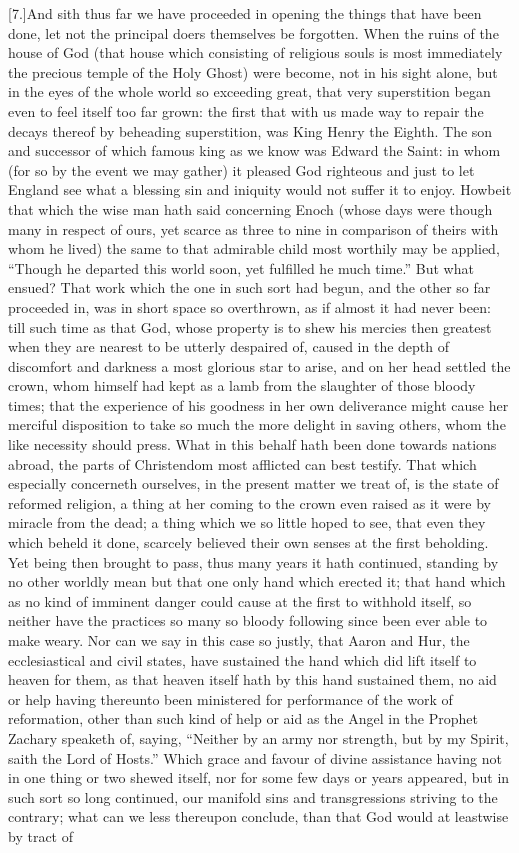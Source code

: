 [7.]And sith thus far we have proceeded in opening the things that have been done, let not the principal doers themselves be forgotten. When the ruins of the house of God (that house which consisting of religious souls is most immediately the precious temple of the Holy Ghost) were become, not in his sight alone, but in the eyes of the whole world so exceeding great, that very superstition began even to feel itself too far grown: the first that with us made way to repair the decays thereof by beheading superstition, was King Henry the Eighth. The son and successor of which famous king as we know was Edward the Saint: in whom (for so by the event we may gather) it pleased God righteous and just to let England see what a blessing sin and iniquity would not suffer it to enjoy. Howbeit that which the wise man hath said concerning Enoch (whose days were though many in respect of ours, yet scarce as three to nine in comparison of theirs with whom he lived) the same to that admirable child most worthily may be applied, “Though he departed this world soon, yet fulfilled he much time.” But what ensued? That work which the one in such sort had begun, and the other so far proceeded in, was in short space so overthrown, as if almost it had never been: till such time as that God, whose property is to shew his mercies then greatest when they are nearest to be utterly despaired of, caused in the depth of discomfort and darkness a most glorious star to arise, and on her head settled the crown, whom himself had kept as a lamb from the slaughter of those bloody times; that the experience of his goodness in her own deliverance might cause her merciful disposition to take so much the more delight in saving others, whom the like necessity should press. What in this behalf  hath been done towards nations abroad, the parts of Christendom most afflicted can best testify. That which especially concerneth ourselves, in the present matter we treat of, is the state of reformed religion, a thing at her coming to the crown even raised as it were by miracle from the dead; a thing which we so little hoped to see, that even they which beheld it done, scarcely believed their own senses at the first beholding. Yet being then brought to pass, thus many years it hath continued, standing by no other worldly mean but that one only hand which erected it; that hand which as no kind of imminent danger could cause at the first to withhold itself, so neither have the practices so many so bloody following since been ever able to make weary. Nor can we say in this case so justly, that Aaron and Hur, the ecclesiastical and civil states, have sustained the hand which did lift itself to heaven for them, as that heaven itself hath by this hand sustained them, no aid or help having thereunto been ministered for performance of the work of reformation, other than such kind of help or aid as the Angel in the Prophet Zachary speaketh of, saying, “Neither by an army nor strength, but by my Spirit, saith the Lord of Hosts.” Which grace and favour of divine assistance having not in one thing or two shewed itself, nor for some few days or years appeared, but in such sort so long continued, our manifold sins and transgressions striving to the contrary; what can we less thereupon conclude, than that God would at leastwise by tract of 